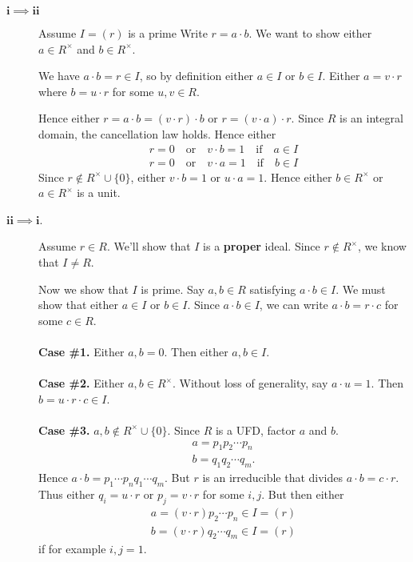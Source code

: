 \documentclass[12pt,letterpaper]{algebra_book}
\theoremstyle{definition}
\begin{document}
\begin{prf}
    \begin{description}
        \item[$\bm{i \implies ii}$] Assume $I = (r)$ is a prime
        Write $r = a \cdot b$. We want to show either $a \in
        R^{\times}$ and $b \in R^{\times}$. 

        We have $a \cdot b = r \in I$, so by definition either $a
        \in I$ or $b \in I$. Either  $a = v \cdot r$ where $b = u
        \cdot r$ for some $u, v \in R$. 

        Hence either $r = a \cdot b = (v \cdot r)\cdot b$ or  $r =
        (v \cdot a) \cdot r$. Since $R$ is an integral domain, the
        cancellation law holds. Hence either
        \begin{align*}
            r = 0 \quad \text{or} \quad v \cdot b = 1 \quad \text{if} \quad a \in I\\ 
            r = 0 \quad \text{or} \quad v \cdot a = 1 \quad \text{if} \quad b \in I  
        \end{align*}
        Since $r \not\in R^{\times}\cup\{0\}$, either $v \cdot b =
        1$ or $u \cdot a = 1$. Hence either $b \in R^{\times}$ or
        $a \in R^{\times}$ is a unit. 

        \item[$\bm{ii  \implies i}$.] Assume $r \in R$. We'll
        show that $I$ is a \textbf{proper} ideal. Since $r \not\in
        R^{\times}$, we know that $I  \ne R$. 

        Now we show that $I$ is prime. Say $a, b \in R$ satisfying
        $a \cdot b \in I$. We must show that either $a \in I$ or $b \in
        I$. Since $a \cdot b \in I$, we can write  $a \cdot b = r
        \cdot c$ for some $c \in  R$. 
        \\
        \\
        \textbf{Case \#1.} Either $a,  b = 0$. Then either $a, b
        \in I$.
        \\
        \\
        \textbf{Case \#2.}  Either  $a, b \in R^{\times}$. Without
        loss of generality, say  $a \cdot u = 1$. Then $b = u
        \cdot r \cdot  c \in I$. 
        \\
        \\
        \textbf{Case \#3.} $a, b \not\in R^{\times}\cup\{0\}$.
        Since $R$ is a UFD, factor $a$ and $b$. 
        \begin{align*}
            a = p_1p_2\cdots p_n\\
            b = q_1q_2\cdots q_m.
        \end{align*}
        Hence $a \cdot b = p_1\cdots p_nq_1 \cdots q_m$. But $r$
        is an irreducible that divides $a \cdot b = c \cdot r$.
        Thus either $q_i = u \cdot r$ or $p_j = v \cdot r$ for
        some $i, j$. But then either 
        \begin{align*}
            a = (v\cdot r) p_2 \cdots p_n \in I = (r)\\
            b = (v \cdot r) q_2 \cdots q_m \in I = (r)
        \end{align*}
        if for example $i, j= 1$. 


\end{description}
\end{prf}
\end{document}
